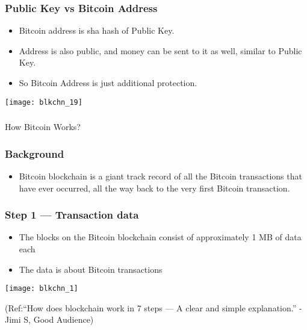\begin{frame}[fragile]\frametitle{Public Key vs Bitcoin Address}
\begin{itemize}
\item Bitcoin address is sha hash of Public Key.
\item Address is also public, and money can be sent to it as well, similar to Public Key.
\item So Bitcoin Address is just additional protection.
\end{itemize}

\begin{center}
\texttt{[image: blkchn\_19]}
\end{center}
\end{frame}

\begin{frame}[fragile]\frametitle{}
\begin{center}
{\Large How Bitcoin Works?}
\end{center}
\end{frame}

\begin{frame}[fragile]\frametitle{Background}
\begin{itemize}
\item Bitcoin blockchain is a giant track record of all the Bitcoin transactions that have ever occurred, all the way back to the very first Bitcoin transaction.
\end{itemize}


\end{frame}

\begin{frame}[fragile]\frametitle{Step 1 — Transaction data}
\begin{itemize}
\item The blocks on the Bitcoin blockchain consist of approximately 1 MB of data each
\item The data is about Bitcoin transactions
\end{itemize}

\begin{center}
\texttt{[image: blkchn\_1]}

{\tiny (Ref:``How does blockchain work in 7 steps — A clear and simple explanation.'' - Jimi S, Good Audience)}
\end{center}

\end{frame}

